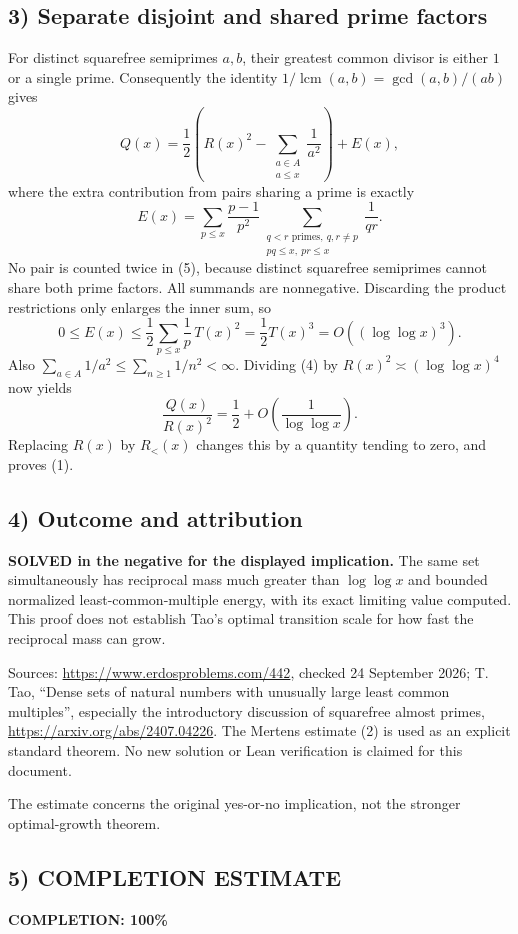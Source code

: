 \subsection*{3) Separate disjoint and shared prime factors}
For distinct squarefree semiprimes $a,b$, their greatest common divisor is either $1$ or a single prime. Consequently the identity $1/\operatorname{lcm}(a,b)=\gcd(a,b)/(ab)$ gives
\[
Q(x)=\frac12\left(R(x)^2-\sum_{\substack{a\in A\\a\le x}}\frac1{a^2}\right)+E(x),\tag{4}
\]
where the extra contribution from pairs sharing a prime is exactly
\[
E(x)=\sum_{p\le x}\frac{p-1}{p^2}
\sum_{\substack{q<r\text{ primes},\ q,r\ne p\\pq\le x,\ pr\le x}}\frac1{qr}.\tag{5}
\]
No pair is counted twice in (5), because distinct squarefree semiprimes cannot share both prime factors. All summands are nonnegative. Discarding the product restrictions only enlarges the inner sum, so
\[0\le E(x)\le\frac12\sum_{p\le x}\frac1p\,T(x)^2
=\frac12T(x)^3=O((\log\log x)^3).\tag{6}\]
Also $\sum_{a\in A}1/a^2\le\sum_{n\ge1}1/n^2<\infty$. Dividing (4) by $R(x)^2\asymp(\log\log x)^4$ now yields
\[\frac{Q(x)}{R(x)^2}=\frac12+O\!\left(\frac1{\log\log x}\right).\]
Replacing $R(x)$ by $R_<(x)$ changes this by a quantity tending to zero, and proves (1).

\subsection*{4) Outcome and attribution}
\textbf{SOLVED in the negative for the displayed implication.} The same set simultaneously has reciprocal mass much greater than $\log\log x$ and bounded normalized least-common-multiple energy, with its exact limiting value computed. This proof does not establish Tao's optimal transition scale for how fast the reciprocal mass can grow.

Sources: \url{https://www.erdosproblems.com/442}, checked 24 September 2026; T. Tao, ``Dense sets of natural numbers with unusually large least common multiples'', especially the introductory discussion of squarefree almost primes, \url{https://arxiv.org/abs/2407.04226}. The Mertens estimate (2) is used as an explicit standard theorem. No new solution or Lean verification is claimed for this document.

The estimate concerns the original yes-or-no implication, not the stronger optimal-growth theorem.
\subsection*{5) COMPLETION ESTIMATE}
\textbf{COMPLETION: 100\%}
